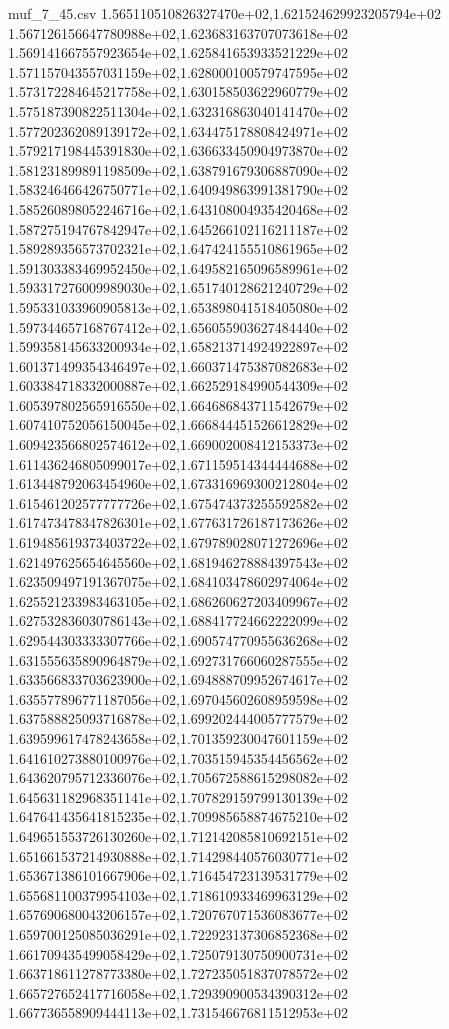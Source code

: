 \begin{filecontents*}{muf_7_45.csv}
1.565110510826327470e+02,1.621524629923205794e+02
1.567126156647780988e+02,1.623683163707073618e+02
1.569141667557923654e+02,1.625841653933521229e+02
1.571157043557031159e+02,1.628000100579747595e+02
1.573172284645217758e+02,1.630158503622960779e+02
1.575187390822511304e+02,1.632316863040141470e+02
1.577202362089139172e+02,1.634475178808424971e+02
1.579217198445391830e+02,1.636633450904973870e+02
1.581231899891198509e+02,1.638791679306887090e+02
1.583246466426750771e+02,1.640949863991381790e+02
1.585260898052246716e+02,1.643108004935420468e+02
1.587275194767842947e+02,1.645266102116211187e+02
1.589289356573702321e+02,1.647424155510861965e+02
1.591303383469952450e+02,1.649582165096589961e+02
1.593317276009989030e+02,1.651740128621240729e+02
1.595331033960905813e+02,1.653898041518405080e+02
1.597344657168767412e+02,1.656055903627484440e+02
1.599358145633200934e+02,1.658213714924922897e+02
1.601371499354346497e+02,1.660371475387082683e+02
1.603384718332000887e+02,1.662529184990544309e+02
1.605397802565916550e+02,1.664686843711542679e+02
1.607410752056150045e+02,1.666844451526612829e+02
1.609423566802574612e+02,1.669002008412153373e+02
1.611436246805099017e+02,1.671159514344444688e+02
1.613448792063454960e+02,1.673316969300212804e+02
1.615461202577777726e+02,1.675474373255592582e+02
1.617473478347826301e+02,1.677631726187173626e+02
1.619485619373403722e+02,1.679789028071272696e+02
1.621497625654645560e+02,1.681946278884397543e+02
1.623509497191367075e+02,1.684103478602974064e+02
1.625521233983463105e+02,1.686260627203409967e+02
1.627532836030786143e+02,1.688417724662222099e+02
1.629544303333307766e+02,1.690574770955636268e+02
1.631555635890964879e+02,1.692731766060287555e+02
1.633566833703623900e+02,1.694888709952674617e+02
1.635577896771187056e+02,1.697045602608959598e+02
1.637588825093716878e+02,1.699202444005777579e+02
1.639599617478243658e+02,1.701359230047601159e+02
1.641610273880100976e+02,1.703515945354456562e+02
1.643620795712336076e+02,1.705672588615298082e+02
1.645631182968351141e+02,1.707829159799130139e+02
1.647641435641815235e+02,1.709985658874675210e+02
1.649651553726130260e+02,1.712142085810692151e+02
1.651661537214930888e+02,1.714298440576030771e+02
1.653671386101667906e+02,1.716454723139531779e+02
1.655681100379954103e+02,1.718610933469963129e+02
1.657690680043206157e+02,1.720767071536083677e+02
1.659700125085036291e+02,1.722923137306852368e+02
1.661709435499058429e+02,1.725079130750900731e+02
1.663718611278773380e+02,1.727235051837078572e+02
1.665727652417716058e+02,1.729390900534390312e+02
1.667736558909444113e+02,1.731546676811512953e+02

\end{filecontents*}
